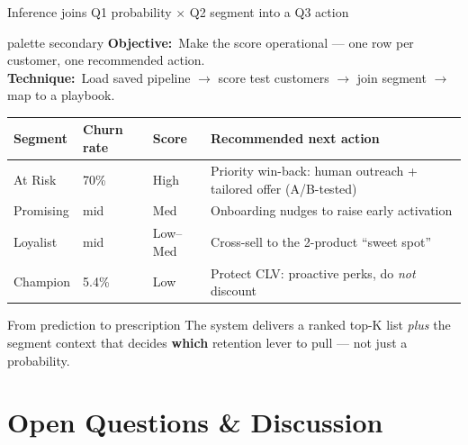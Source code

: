 \documentclass[11pt,aspectratio=169]{beamer}
\newcommand{\aimtech}[2]{%
  \begin{beamercolorbox}[wd=\textwidth,sep=5pt,rounded=true]{palette secondary}
    \footnotesize\textbf{Objective:}~#1\\[1pt]\textbf{Technique:}~#2
  \end{beamercolorbox}\vspace{3pt}%
}
\begin{document}
\begin{frame}{Inference joins Q1 probability \(\times\) Q2 segment into a Q3 action}
  \aimtech{Make the score operational --- one row per customer, one recommended action.}%
          {Load saved pipeline \(\to\) score test customers \(\to\) join segment \(\to\) map to a playbook.}
  \renewcommand{\arraystretch}{1.3}
  \begin{center}
  \footnotesize
  \begin{tabularx}{\textwidth}{@{}p{}p{}p{}X@{}}
    \toprule
    \textbf{Segment} & \textbf{Churn rate} & \textbf{Score} & \textbf{Recommended next action} \\
    \midrule
    At Risk & 70\% & High & Priority win-back: human outreach + tailored offer (A/B-tested) \\
    Promising & mid & Med & Onboarding nudges to raise early activation \\
    Loyalist & mid & Low--Med & Cross-sell to the 2-product ``sweet spot'' \\
    Champion & 5.4\% & Low & Protect CLV: proactive perks, do \emph{not} discount \\
    \bottomrule
  \end{tabularx}
  \end{center}
  \begin{exampleblock}{\small From prediction to prescription}
    \footnotesize The system delivers a ranked top-K list \emph{plus} the segment context that decides \textbf{which} retention lever to pull --- not just a probability.
  \end{exampleblock}
\end{frame}

\section{Open Questions \& Discussion}
\end{document}
